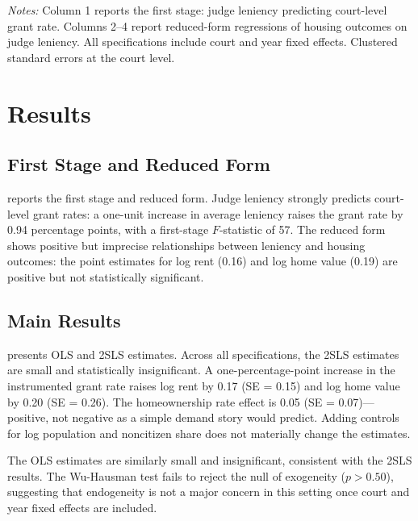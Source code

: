 \documentclass[12pt]{article}
\begin{document}
\begin{table}[htbp]
\caption{First Stage and Reduced Form}\label{tab:fs_rf}

\begin{tablenotes}\small
\item \textit{Notes:} Column 1 reports the first stage: judge leniency predicting court-level grant rate. Columns 2--4 report reduced-form regressions of housing outcomes on judge leniency. All specifications include court and year fixed effects. Clustered standard errors at the court level.
\end{tablenotes}
\end{table}


\section{Results}

\subsection{First Stage and Reduced Form}

 reports the first stage and reduced form. Judge leniency strongly predicts court-level grant rates: a one-unit increase in average leniency raises the grant rate by 0.94 percentage points, with a first-stage $F$-statistic of 57. The reduced form shows positive but imprecise relationships between leniency and housing outcomes: the point estimates for log rent (0.16) and log home value (0.19) are positive but not statistically significant.

\subsection{Main Results}

 presents OLS and 2SLS estimates. Across all specifications, the 2SLS estimates are small and statistically insignificant. A one-percentage-point increase in the instrumented grant rate raises log rent by 0.17 (SE = 0.15) and log home value by 0.20 (SE = 0.26). The homeownership rate effect is 0.05 (SE = 0.07)---positive, not negative as a simple demand story would predict. Adding controls for log population and noncitizen share does not materially change the estimates.

The OLS estimates are similarly small and insignificant, consistent with the 2SLS results. The Wu-Hausman test fails to reject the null of exogeneity ($p > 0.50$), suggesting that endogeneity is not a major concern in this setting once court and year fixed effects are included.
\end{document}
